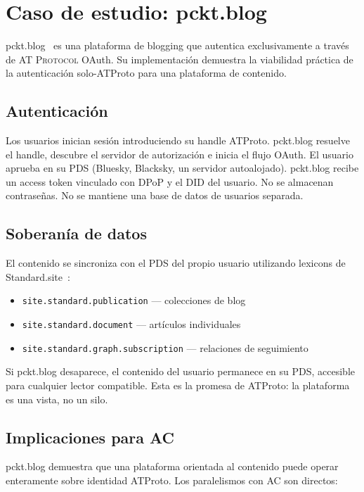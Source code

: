 \documentclass[10pt,letterpaper,twocolumn]{article}
\newcommand{\atproto}{\textsc{AT Protocol}}
\begin{document}
\section{Caso de estudio: pckt.blog}
\label{sec:pckt}

pckt.blog~\citep{pcktblog2025} es una plataforma de blogging que autentica exclusivamente a través de \atproto{} OAuth. Su implementación demuestra la viabilidad práctica de la autenticación solo-ATProto para una plataforma de contenido.

\subsection{Autenticación}

Los usuarios inician sesión introduciendo su handle ATProto. pckt.blog resuelve el handle, descubre el servidor de autorización e inicia el flujo OAuth. El usuario aprueba en su PDS (Bluesky, Blacksky, un servidor autoalojado). pckt.blog recibe un access token vinculado con DPoP y el DID del usuario. No se almacenan contraseñas. No se mantiene una base de datos de usuarios separada.

\subsection{Soberanía de datos}

El contenido se sincroniza con el PDS del propio usuario utilizando lexicons de Standard.site~\citep{standardsite2025}:

\begin{itemize}
  \item \texttt{site.standard.publication} --- colecciones de blog
  \item \texttt{site.standard.document} --- artículos individuales
  \item \texttt{site.standard.graph.subscription} --- relaciones de seguimiento
\end{itemize}

Si pckt.blog desaparece, el contenido del usuario permanece en su PDS, accesible para cualquier lector compatible. Esta es la promesa de ATProto: la plataforma es una vista, no un silo.

\subsection{Implicaciones para AC}

pckt.blog demuestra que una plataforma orientada al contenido puede operar enteramente sobre identidad ATProto. Los paralelismos con AC son directos:
\end{document}

